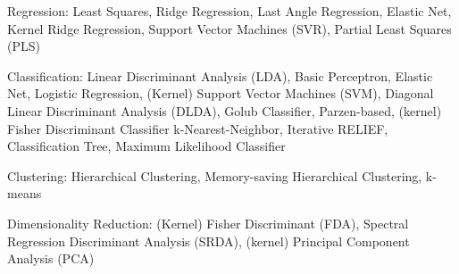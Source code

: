 Regression: Least Squares, Ridge Regression, Last Angle Regression, Elastic Net, Kernel Ridge Regression, Support Vector Machines (SVR), Partial Least Squares (PLS)

Classification: Linear Discriminant Analysis (LDA), Basic Perceptron, Elastic Net, Logistic Regression, (Kernel) Support Vector Machines (SVM), Diagonal Linear Discriminant Analysis (DLDA), Golub Classifier, Parzen-based, (kernel) Fisher Discriminant Classifier k-Nearest-Neighbor, Iterative RELIEF, Classification Tree, Maximum Likelihood Classifier

Clustering: Hierarchical Clustering, Memory-saving Hierarchical Clustering, k-means

Dimensionality Reduction: (Kernel) Fisher Discriminant (FDA), Spectral Regression Discriminant Analysis (SRDA), (kernel) Principal Component Analysis (PCA)
